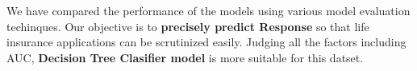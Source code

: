 \documentclass[11pt]{article}
\begin{document}
    We have compared the performance of the models using various model
evaluation techinques. Our objective is to \textbf{precisely predict
Response} so that life insurance applications can be scrutinized easily.
Judging all the factors including AUC, \textbf{Decision Tree Clasifier
model} is more suitable for this datset.


    
    
    
    
\end{document}
